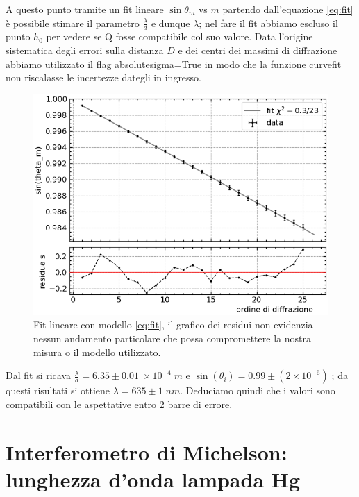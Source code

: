 \documentclass[10pt, a4paper, italian]{article}
\begin{document}
A questo punto tramite un fit lineare $\sin{\theta_m}$ vs $m$ partendo dall'equazione \ref{eq:fit} è possibile stimare il parametro $\frac{\lambda}{d}$ e dunque $\lambda$; nel fare il fit abbiamo escluso il punto $h_0$ per vedere se Q fosse compatibile col suo valore.
Data l'origine sistematica degli errori sulla distanza $D$ e dei centri dei massimi di diffrazione abbiamo utilizzato il flag absolute\textunderscore sigma=True in modo che la funzione curve\textunderscore fit non riscalasse le incertezze dategli in ingresso.
\begin{figure}
\includegraphics[width=\textwidth]{fit1}
\caption{\label{linfit1} Fit lineare con modello \ref{eq:fit}, il grafico dei residui non evidenzia nessun andamento particolare che possa compromettere la nostra misura o il modello utilizzato.}
\end{figure}
Dal fit si ricava $\frac{\lambda}{d}=6.35 \pm 0.01 \;\times 10^{-4} \; m$ e $\sin(\theta _i) =0.99 \pm (2 \times 10^{-6})\;$; da questi risultati si ottiene $\lambda=635 \pm 1 \;nm$.
Deduciamo quindi che i valori sono compatibili con le aspettative entro 2 barre di errore.
\section{Interferometro di Michelson: lunghezza d'onda lampada Hg}
\end{document}
